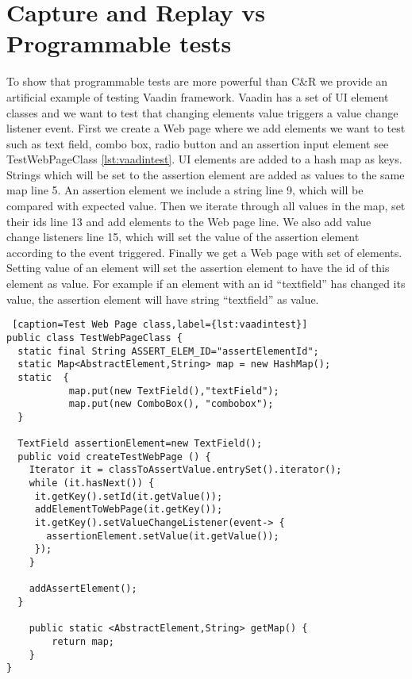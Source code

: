 \section{Capture and Replay vs Programmable tests}
  		To show that programmable tests are more powerful than C\&R we provide an
			artificial example of testing Vaadin framework.		
			Vaadin has a set of UI element classes and we want to	test that changing elements value triggers a value change listener event.
			First we create a Web page where we add elements we
			want to test such as text field, combo box, radio button and an	assertion
			input element see TestWebPageClass \ref{lst:vaadintest}.
       UI elements are added to a hash map
			as keys. Strings which will be set to the assertion element are added as
			values to the same map line 5.
			An assertion element we include a string line 9, which will be  compared with
      expected value.  Then we iterate through all values in the map, set their
      ids line 13 and add elements to the Web page line. We also add value
      change listeners line 15, which will set the value of the assertion
      element according to the event triggered. Finally we get a Web page with set of elements. 
      Setting value of an element will set the assertion element to have the id
      of this element as value. For example if an element with an id
      ``textfield'' has changed its value, the assertion element will have
      string ``textfield'' as value.
					
\lstset{style=a1listing}
\begin{lstlisting} [caption=Test Web Page class,label={lst:vaadintest}]
public class TestWebPageClass {
  static final String ASSERT_ELEM_ID="assertElementId";
  static Map<AbstractElement,String> map = new HashMap();
  static  {
    	   map.put(new TextField(),"textField");
    	   map.put(new ComboBox(), "combobox");
  }
  
  TextField assertionElement=new TextField();
  public void createTestWebPage () {
    Iterator it = classToAssertValue.entrySet().iterator();
  	while (it.hasNext()) {
  	 it.getKey().setId(it.getValue());
  	 addElementToWebPage(it.getKey());
  	 it.getKey().setValueChangeListener(event-> {
  	   assertionElement.setValue(it.getValue());
  	 });
  	}
  	
  	addAssertElement();
  }  
  	
  	public static <AbstractElement,String> getMap() {
  		return map;
  	}
}
\end{lstlisting}
      
